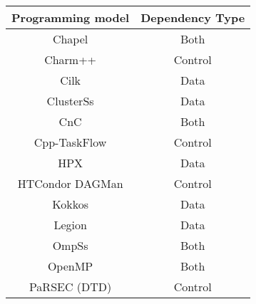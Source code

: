 \begin{tabular}{cc}
\hline
Programming model & Dependency Type \\
\hline
Chapel & Both\\
Charm++ & Control\\
Cilk & Data\\
ClusterSs & Data\\
CnC & Both\\
Cpp-TaskFlow & Control\\
HPX & Data\\
HTCondor DAGMan & Control\\
Kokkos & Data\\
Legion & Data\\
OmpSs & Both\\
OpenMP & Both\\
PaRSEC (DTD) & Control\\
\hline
\end{tabular}
